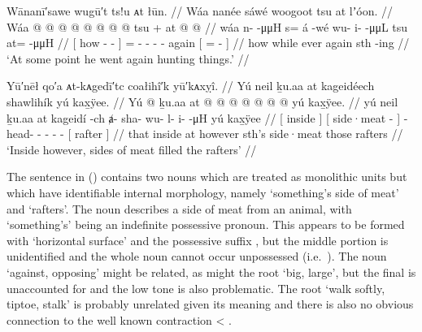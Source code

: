 \ex\label{ex:91-8-went-again-hunting}%
%
\begingl
	\glpreamble	Wānanī′sawe wugū′t ts!u ᴀt łūn. //
	\glpreamble	Wáa nanée sáwé woogoot tsu at lʼóon. //
	\gla	{} Wáa  @ {} @ {} @ {} {}
		 @ {} @ {}
		 @ {} @ {} @ {} tsu +
		{} at @  @ {} {} {} //
	\glb	{} wáa n-  -μμH {} {} 
		s= á -wé
		wu- i-  -μμL tsu
		{} at=  -μμH {} {} //
	\glc	{}[ how -  - \· {}]
		=  -
		- -  - again
		{}[ =  - \hspace{1.5em}\· {}] //
	\gld	{} how  {} {} \·while {}
		ever\·  {}
		 {} {} {} again
		{} sth\•  {} \hspace{1.5em}-ing {} //
	\glft	‘At some point he went again hunting things.’
		//
\endgl
\xe


\ex\label{ex:91-9-went-again-hunting}%
%
\begingl
	\glpreamble	Yū′nēł qo′a ᴀt-kᴀgedī′tc coałihî′k yū′kᴀxỵî. //
	\glpreamble	Yú neil ḵu.aa at kageidéech shawlihík yú kax̱ÿee. //
	\gla	{} Yú  @ {} {} ḵu.aa
		{} at  @ {} {}
		 @ {} @ {} @ {} @ {} @ {} @ {}
		{} yú kax̱ÿee. {} //
	\glb	{} yú neil {} {} ḵu.aa
		{} at kageidí -ch {}
		ⱥ- sha- wu- l- i-  -μH
		{} yú kax̱ÿee {} //
	\glc	{}[  inside \· {}] 
		{}[  side·meat - {}]
		- head- - - -  -
		{}[  rafter {}] //
	\gld	{} that inside \·at {} however
		{} sth’s side·meat {} {}
		 {} {} {} {} {} {}
		{} those rafters {} //
	\glft	‘Inside however, sides of meat filled the rafters’
		//
\endgl
\xe

The sentence in (\lastx) contains two nouns which are treated as monolithic units but which have identifiable internal morphology, namely  ‘something’s side of meat’ and  ‘rafters’.
The noun  describes a side of meat from an animal, with  ‘something’s’ being an indefinite possessive pronoun.
This appears to be formed with  ‘horizontal surface’ and the possessive suffix , but the middle portion  is unidentified and the whole noun cannot occur unpossessed (i.e.\ ).
The noun  ‘against, opposing’ might be related, as might the root  ‘big, large’, but the final  is unaccounted for and the low tone is also problematic.
The root  ‘walk softly, tiptoe, stalk’ is probably unrelated given its meaning and there is also no obvious connection to the well known contraction  < .

